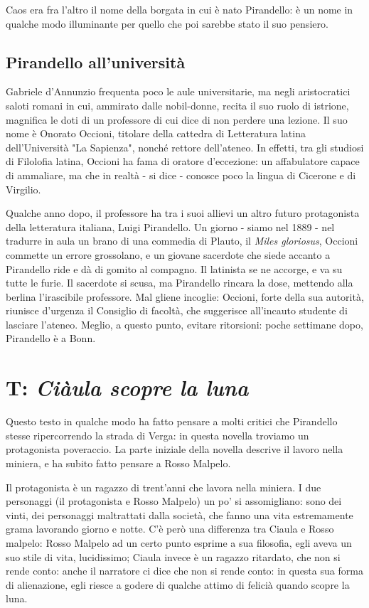 \documentclass[a4paper, twoside, titlepage]{book}
\begin{document}
Caos era fra l'altro il nome della borgata in cui è nato Pirandello: è un nome in qualche modo illuminante per quello che poi sarebbe stato il suo pensiero.

\section{Pirandello all'università}

Gabriele d'Annunzio frequenta poco le aule universitarie, ma negli aristocratici saloti romani in cui, ammirato dalle nobil-donne, recita il suo ruolo di istrione, magnifica le doti di un professore di cui dice di non perdere una lezione. Il suo nome è Onorato Occioni, titolare della cattedra di Letteratura latina dell'Università "La Sapienza", nonché rettore dell'ateneo. In effetti, tra gli studiosi di Filolofia latina, Occioni ha fama di oratore d'eccezione: un affabulatore capace di ammaliare, ma che in realtà - si dice - conosce poco la lingua di Cicerone e di Virgilio.

Qualche anno dopo, il professore ha tra i suoi allievi un altro futuro protagonista della letteratura italiana, Luigi Pirandello. Un giorno - siamo nel 1889 - nel tradurre in aula un brano di una commedia di Plauto, il \textit{Miles gloriosus}, Occioni commette un errore grossolano, e un giovane sacerdote che siede accanto a Pirandello ride e dà di gomito al compagno. Il latinista se ne accorge, e va su tutte le furie. Il sacerdote si scusa, ma Pirandello rincara la dose, mettendo alla berlina l'irascibile professore. Mal gliene incoglie: Occioni, forte della sua autorità, riunisce d'urgenza il Consiglio di facoltà, che suggerisce all'incauto studente di lasciare l'ateneo. Meglio, a questo punto, evitare ritorsioni: poche settimane dopo, Pirandello è a Bonn.


\chapter{T: \textit{Ciàula scopre la luna}}

Questo testo in qualche modo ha fatto pensare a molti critici che Pirandello stesse ripercorrendo la strada di Verga: in questa novella troviamo un protagonista poveraccio.
La parte iniziale della novella descrive il lavoro nella miniera, e ha subito fatto pensare a Rosso Malpelo.

Il protagonista è un ragazzo di trent'anni che lavora nella miniera. I due personaggi (il protagonista e Rosso Malpelo) un po' si assomigliano: sono dei vinti, dei personaggi maltrattati dalla società, che fanno una vita estremamente grama lavorando giorno e notte.
C'è però una differenza tra Ciaula e Rosso malpelo: Rosso Malpelo ad un certo punto esprime a sua filosofia, egli aveva un suo stile di vita, lucidissimo; Ciaula invece è un ragazzo ritardato, che non si rende conto: anche il narratore ci dice che non si rende conto: in questa sua forma di alienazione, egli riesce a godere di qualche attimo di felicià quando scopre la luna.
\end{document}
